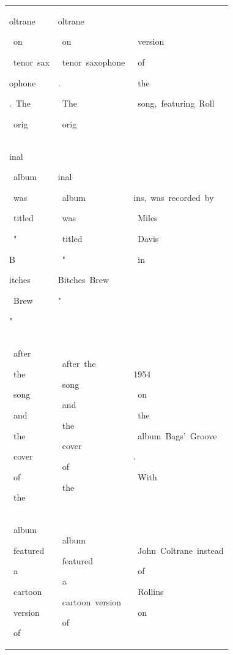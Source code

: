 \begin{table}[h]
\begin{tabular}{ l | l | l }
 \colorbox{cm_32!40}{\strut oltrane}\colorbox{cm_28!40}{\strut \ on}\colorbox{cm_32!40}{\strut \ tenor\ sax}\colorbox{cm_30!40}{\strut ophone}\colorbox{cm_32!40}{\strut .\ The}\colorbox{cm_26!40}{\strut \ orig} & \colorbox{cm_0!40}{\strut oltrane}\colorbox{cm_12!40}{\strut \ on}\colorbox{cm_0!40}{\strut \ tenor\ saxophone}\colorbox{cm_12!40}{\strut .}\colorbox{cm_25!40}{\strut \ The}\colorbox{cm_0!40}{\strut \ orig} & \colorbox{cm_0!40}{\strut \ version}\colorbox{cm_12!40}{\strut \ of}\colorbox{cm_25!40}{\strut \ the}\colorbox{cm_0!40}{\strut \ song,\ featuring\ Roll} \\ 
 \colorbox{cm_26!40}{\strut inal}\colorbox{cm_18!40}{\strut \ album}\colorbox{cm_35!40}{\strut \ was}\colorbox{cm_40!40}{\strut \ titled}\colorbox{cm_28!40}{\strut \ "}\colorbox{cm_35!40}{\strut B}\colorbox{cm_32!40}{\strut itches}\colorbox{cm_31!40}{\strut \ Brew}\colorbox{cm_32!40}{\strut "} & \colorbox{cm_0!40}{\strut inal}\colorbox{cm_12!40}{\strut \ album}\colorbox{cm_25!40}{\strut \ was}\colorbox{cm_0!40}{\strut \ titled}\colorbox{cm_12!40}{\strut \ "}\colorbox{cm_0!40}{\strut Bitches\ Brew}\colorbox{cm_12!40}{\strut "} & \colorbox{cm_0!40}{\strut ins,\ was\ recorded\ by}\colorbox{cm_12!40}{\strut \ Miles}\colorbox{cm_25!40}{\strut \ Davis}\colorbox{cm_12!40}{\strut \ in}\colorbox{cm_0!40}{\strut \ } \\ 
 \colorbox{cm_34!40}{\strut \ after}\colorbox{cm_31!40}{\strut \ the}\colorbox{cm_42!40}{\strut \ song}\colorbox{cm_36!40}{\strut \ and}\colorbox{cm_41!40}{\strut \ the}\colorbox{cm_36!40}{\strut \ cover}\colorbox{cm_30!40}{\strut \ of}\colorbox{cm_33!40}{\strut \ the} & \colorbox{cm_12!40}{\strut \ after\ the}\colorbox{cm_25!40}{\strut \ song}\colorbox{cm_12!40}{\strut \ and}\colorbox{cm_25!40}{\strut \ the}\colorbox{cm_0!40}{\strut \ cover}\colorbox{cm_12!40}{\strut \ of}\colorbox{cm_25!40}{\strut \ the} & \colorbox{cm_0!40}{\strut 1954}\colorbox{cm_12!40}{\strut \ on}\colorbox{cm_25!40}{\strut \ the}\colorbox{cm_0!40}{\strut \ album\ Bags'\ Groove}\colorbox{cm_12!40}{\strut .}\colorbox{cm_0!40}{\strut \ With} \\ 
 \colorbox{cm_32!40}{\strut \ album}\colorbox{cm_21!40}{\strut \ featured}\colorbox{cm_31!40}{\strut \ a}\colorbox{cm_28!40}{\strut \ cartoon}\colorbox{cm_30!40}{\strut \ version}\colorbox{cm_32!40}{\strut \ of} & \colorbox{cm_38!40}{\strut \ album}\colorbox{cm_0!40}{\strut \ featured}\colorbox{cm_12!40}{\strut \ a}\colorbox{cm_0!40}{\strut \ cartoon\ version}\colorbox{cm_12!40}{\strut \ of} & \colorbox{cm_0!40}{\strut \ John\ Coltrane\ instead}\colorbox{cm_12!40}{\strut \ of}\colorbox{cm_0!40}{\strut \ Rollins}\colorbox{cm_12!40}{\strut \ on} \\ 

\end{tabular}
\end{table}
